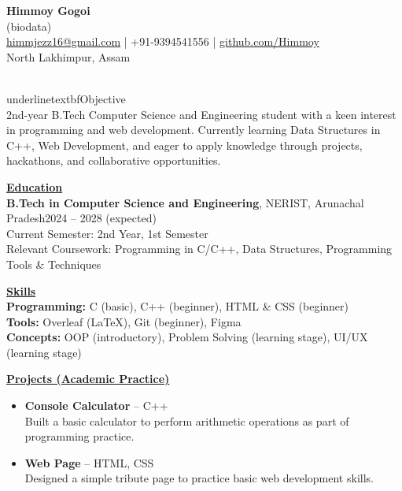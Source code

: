 \documentclass[11pt,a4paper]{article}
\begin{document}
\begin{center}
    {\LARGE \textbf{Himmoy Gogoi}}\\
    \vspace{4pt}
    (biodata) \\
    \href{mailto:himmjezz16@gmail.com}{himmjezz16@gmail.com} \;|\;
    +91-9394541556 \;|\;
    \href{https://github.com/ryukiss}{github.com/Himmoy}\\
    North Lakhimpur, Assam
\end{center}

\vspace{8pt}
\noindent\\underline{textbf{Objective}}\\
2nd-year B.Tech Computer Science and Engineering student with a keen interest in programming and web development. Currently learning Data Structures in C++, Web Development, and eager to apply knowledge through projects, hackathons, and collaborative opportunities.

\vspace{8pt}
\noindent\underline{\textbf{Education}}\\
\textbf{B.Tech in Computer Science and Engineering}, NERIST, Arunachal Pradesh\hfill 2024 -- 2028 (expected)\\
Current Semester: 2nd Year, 1st Semester \\
Relevant Coursework: Programming in C/C++, Data Structures, Programming Tools \& Techniques

\vspace{8pt}
\noindent\underline{\textbf{Skills}}\\
\textbf{Programming:} C (basic), C++ (beginner), HTML \& CSS (beginner) \\
\textbf{Tools:} Overleaf (LaTeX), Git (beginner), Figma \\
\textbf{Concepts:} OOP (introductory), Problem Solving (learning stage), UI/UX (learning stage)

\vspace{8pt}
\noindent\underline{\textbf{Projects (Academic Practice)}}
\begin{itemize}
    \item \textbf{Console Calculator} -- C++ \\
    Built a basic calculator to perform arithmetic operations as part of programming practice.
    \item \textbf{Web Page} -- HTML, CSS \\
    Designed a simple tribute page to practice basic web development skills.
\end{itemize}
\end{document}
